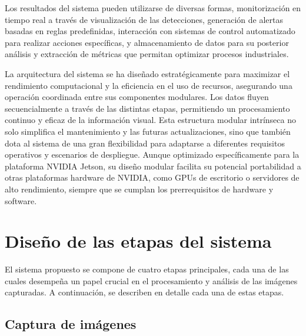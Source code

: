 \documentclass[11pt,spanish,listoffigures,listoftables]{tfgetsinf}
\begin{document}
Los resultados del sistema pueden utilizarse de diversas formas, monitorización en tiempo real a través de visualización de las detecciones, generación de alertas basadas en reglas predefinidas, interacción con sistemas de control automatizado para realizar acciones específicas, y almacenamiento de datos para su posterior análisis y extracción de métricas que permitan optimizar procesos industriales.

La arquitectura del sistema se ha diseñado estratégicamente para maximizar el rendimiento computacional y la eficiencia en el uso de recursos, asegurando una operación coordinada entre sus componentes modulares. Los datos fluyen secuencialmente a través de las distintas etapas, permitiendo un procesamiento continuo y eficaz de la información visual. Esta estructura modular intrínseca no solo simplifica el mantenimiento y las futuras actualizaciones, sino que también dota al sistema de una gran flexibilidad para adaptarse a diferentes requisitos operativos y escenarios de despliegue. Aunque optimizado específicamente para la plataforma NVIDIA Jetson, su diseño modular facilita su potencial portabilidad a otras plataformas hardware de NVIDIA, como GPUs de escritorio o servidores de alto rendimiento, siempre que se cumplan los prerrequisitos de hardware y software.


\section{Diseño de las etapas del sistema}

El sistema propuesto se compone de cuatro etapas principales, cada una de las cuales desempeña un papel crucial en el procesamiento y análisis de las imágenes capturadas. A continuación, se describen en detalle cada una de estas etapas.

\subsection{Captura de imágenes}
\end{document}
